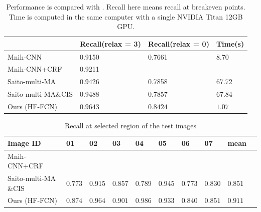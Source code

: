 \documentclass[runningheads]{llncs}
\begin{document}
    \begin{table} \label{tab:PerformanceComparision}
    \centering
	\caption{Performance is compared with \cite{Mnih2013Machine}\cite{Saito2016Multiple}. Recall here  means recall at breakeven points. Time is computed in the same computer with a single NVIDIA Titan 12GB GPU.}
	\begin{tabular}{L{38mm}C{26mm}C{26mm}C{26mm}}     
	\toprule
	& Recall(relax = 3) & Recall(relax = 0)& Time(s)\\
	\midrule
	Mnih-CNN\cite{Mnih2013Machine} & 0.9150 & 0.7661 & 8.70  \\ 
	Mnih-CNN+CRF\cite{Mnih2013Machine} & 0.9211&  & \\ 
	Saito-multi-MA\cite{Saito2016Multiple} & 0.9426 & 0.7858 & 67.72 \\
	Saito-multi-MA$\&$CIS\cite{Saito2016Multiple} & 0.9488 & 0.7857 & 67.84 \\
	Ours (HF-FCN) & $\bm{0.9643}$ & $\bm{0.8424}$ & $\bm{1.07}$\\
	\bottomrule
	\end{tabular}
	\end{table} 
	 
	\begin{table} \label{tab:ComparedResultsRecall}
    \centering
	\caption{Recall at selected region of the test images}
	\begin{tabular}{L{38mm}*{9}{C{9mm}}}     
	\toprule
	Image ID & 01 & 02 & 03 &04 &05 & 06 &07 & mean\\
	\midrule
	Mnih-CNN+CRF\cite{Mnih2013Machine} & &  &  & &\\
	Saito-multi-MA$\&$CIS\cite{Saito2016Multiple} & 0.773 & 0.915 & 0.857 & 0.789 & 0.945 & 0.773 &0.830 & 0.851\\
	Ours (HF-FCN) & $\bm{0.874}$ & $\bm{0.964}$  & $\bm{0.901}$ & $\bm{0.986}$ & $\bm{0.933}$ & $\bm{0.840}$ &  $\bm{0.851}$ & $\bm{0.911}$\\
	\bottomrule
	\end{tabular}
	\end{table} 
 	 
\end{document}
